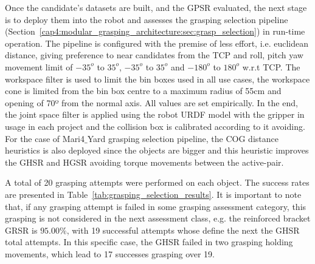 Once the candidate's datasets are built, and the \ac{GPSR} evaluated, the next stage is to deploy them into the robot and assesses the grasping selection pipeline (Section~\ref{cap4:modular_grasping_architecture:sec:grasp_selection}) in run-time operation. The pipeline is configured with the premise of less effort, i.e. euclidean distance, giving preference to near candidates from the \ac{TCP} and roll, pitch yaw movement limit of $-35^o$ to $35^o$, $-35^o$ to $35^o$ and $-180^o$ to $180^o$ w.r.t \ac{TCP}. The workspace filter is used to limit the bin boxes used in all use cases, the workspace cone is limited from the bin box centre to a maximum radius of 55cm and opening of 70º from the normal axis. All values are set empirically. In the end, the joint space filter is applied using the robot URDF model with the gripper in usage in each project and the collision box is calibrated according to it avoiding. For the case of Mari4$\_$Yard grasping selection pipeline, the \ac{COG} distance heuristics is also deployed since the objects are bigger and this heuristic improves the \ac{GHSR} and \ac{HGSR} avoiding torque movements between the active-pair. 

A total of 20 grasping attempts were performed on each object. The success rates are presented in Table~\ref{tab:grasping_selection_results}. It is important to note that, if any grasping attempt is failed in some grasping assessment category, this grasping is not considered in the next assessment class, e.g. the reinforced bracket \ac{GRSR} is $95.00\%$, with 19 successful attempts whose define the next the \ac{GHSR} total attempts. In this specific case, the \ac{GHSR} failed in two grasping holding movements, which lead to 17 successes grasping over 19.


